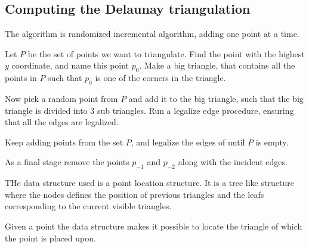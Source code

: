 \documentclass[10pt]{article}
\begin{document}


\subsection{Computing the Delaunay triangulation} %
\label{sub:computing_the_delaunay_triangulation}
The algorithm is randomized incremental algorithm, adding one point at a time.

Let $P$ be the set of points we want to triangulate. Find the point with the highest $y$ coordinate, and name this point $p_0$. Make a big triangle, that contains all the points in $P$ such that $p_0$ is one of the corners in the triangle. 

Now pick a random point from $P$ and add it to the big triangle, such that the big triangle is divided into $3$ sub triangles. Run a legalize edge procedure, ensuring that all the edges are legalized.

Keep adding points from the set $P$, and legalize the edges of until $P$ is empty. 

As a final stage remove the points $p_{-1}$ and $p_{-2}$ along with the incident edges. 

THe data structure used is a point location structure. It is a tree like structure where the nodes defines the position of previous triangles and the leafs corresponding to the current visible triangles. 

Given a point the data structure makes it possible to locate the triangle of which the point is placed upon. 
\end{document}
